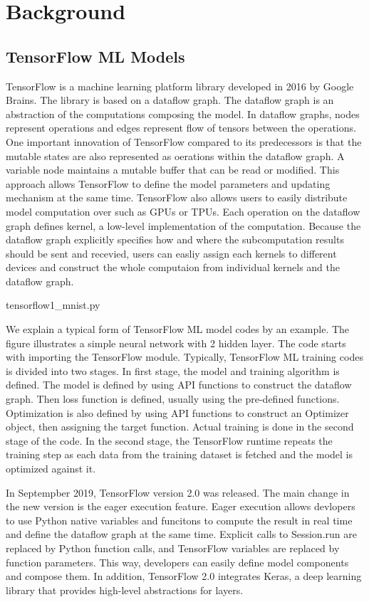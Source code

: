 \section{Background}\label{sec:background}
\subsection{TensorFlow ML Models}

TensorFlow\cite{tensorflow} is a machine learning platform library
developed in 2016 by Google Brains.
The library is based on a dataflow graph.
The dataflow graph is an abstraction of the computations
composing the model.
In dataflow graphs, nodes represent operations and
edges represent flow of tensors between the operations.
One important innovation of TensorFlow compared to its predecessors
is that the mutable states are also represented as oerations
within the dataflow graph. 
A variable node maintains a mutable buffer that can be read or modified.
This approach allows TensorFlow to define the model parameters
and updating mechanism at the same time.
TensorFlow also allows users to easily distribute model computation over
such as GPUs or TPUs.
Each operation on the dataflow graph defines kernel,
a low-level implementation of the computation.
Because the dataflow graph explicitly specifies how
and where the subcomputation results should be sent and recevied,
users can easliy assign each kernels to different devices and construct
the whole computaion from individual kernels and the dataflow graph.


{tensorflow1_mnist.py}

We explain a typical form of TensorFlow ML model codes by an example.
The figure illustrates a simple neural network with 2 hidden layer.
The code starts with importing the TensorFlow module.
Typically, TensorFlow ML training codes is divided into two stages.
In first stage, the model and training algorithm is defined.
The model is defined by using API functions to construct the dataflow graph.
Then loss function is defined, usually using the pre-defined functions.
Optimization is also defined by using API functions to construct
an Optimizer object, then assigning the target function.
Actual training is done in the second stage of the code.
In the second stage, the TensorFlow runtime repeats the training step
as each data from the training dataset is fetched and
the model is optimized against it.

In Septempber 2019, TensorFlow version 2.0 was released\cite{tf2announce}.
The main change in the new version is the eager execution feature.
Eager execution allows devlopers to use Python native variables
and funcitons to compute the result in real time and define the
dataflow graph at the same time.
Explicit calls to Session.run are replaced by Python function calls,
and TensorFlow variables are replaced by function parameters.
This way, developers can easily define model components
and compose them. 
In addition, TensorFlow 2.0 integrates Keras\cite{keras},
a deep learning library that provides high-level abstractions for layers.

